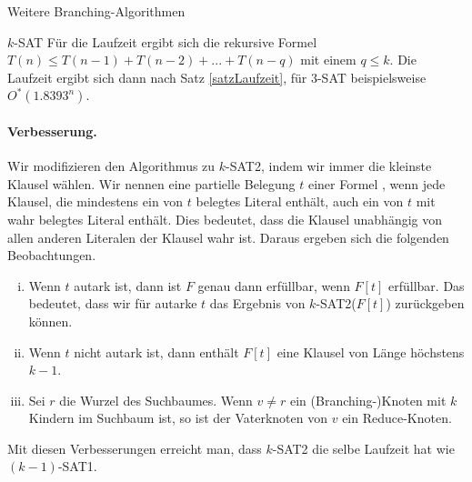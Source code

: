 \begin{section}{Weitere Branching-Algorithmen}
\begin{subsection}{$k$-SAT}
  Für die Laufzeit ergibt sich die rekursive Formel \(T(n) \leq T(n-1) + T(n-2) + ... + T(n-q)\) mit einem \(q \leq k\). Die Laufzeit ergibt sich dann nach Satz \ref{satzLaufzeit}, für \(3\)-SAT beispielsweise \(O^*(1.8393^n)\).

  \paragraph{Verbesserung.} Wir modifizieren den Algorithmus zu \(k\)-SAT2, indem wir immer die kleinste Klausel wählen. Wir nennen eine partielle Belegung \(t\) einer Formel , wenn jede Klausel, die mindestens ein von \(t\) belegtes Literal enthält, auch ein von \(t\) mit wahr belegtes Literal enthält. Dies bedeutet, dass die Klausel unabhängig von allen anderen Literalen der Klausel wahr ist. Daraus ergeben sich die folgenden Beobachtungen.
  \begin{enumerate}[(i)]
   \item Wenn \(t\) autark ist, dann ist \(F\) genau dann erfüllbar, wenn \(F[t]\) erfüllbar. Das bedeutet, dass wir für autarke \(t\) das Ergebnis von \(k\)-SAT2(\(F[t]\)) zurückgeben können.
   \item Wenn \(t\) nicht autark ist, dann enthält \(F[t]\) eine Klausel von Länge höchstens \(k-1\).
   \item Sei \(r\) die Wurzel des Suchbaumes. Wenn \(v \neq r\) ein (Branching-)Knoten mit \(k\) Kindern im Suchbaum ist, so ist der Vaterknoten von \(v\) ein Reduce-Knoten.
  \end{enumerate}
  Mit diesen Verbesserungen erreicht man, dass \(k\)-SAT2 die selbe Laufzeit hat wie \((k-1)\)-SAT1.
\end{subsection}
\end{section}
  
  
